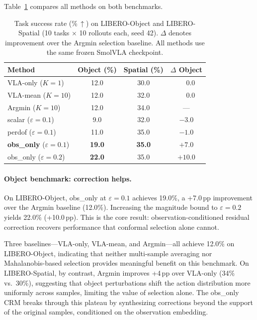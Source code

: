 Table~\ref{tab:main} compares all methods on both benchmarks.

\begin{table}[t]
\centering
\caption{Task success rate (\%\,$\uparrow$) on LIBERO-Object and LIBERO-Spatial (10 tasks $\times$ 10 rollouts each, seed 42). $\Delta$ denotes improvement over the Argmin selection baseline. All methods use the same frozen SmolVLA checkpoint.}
\label{tab:main}
\small
\begin{tabular}{lccc}
\toprule
Method & Object (\%) & Spatial (\%) & $\Delta$ Object \\
\midrule
VLA-only ($K{=}1$)    & 12.0 & 30.0 & $\phantom{+}0.0$ \\
VLA-mean ($K{=}10$)   & 12.0 & 32.0 & $\phantom{+}0.0$ \\
Argmin ($K{=}10$)      & 12.0 & 34.0 & --- \\
\midrule
scalar ($\varepsilon{=}0.1$)  & \phantom{0}9.0 & 32.0 & $-3.0$ \\
perdof ($\varepsilon{=}0.1$)  & 11.0 & 35.0 & $-1.0$ \\
\textbf{obs\_only} ($\varepsilon{=}0.1$) & \textbf{19.0} & \textbf{35.0} & $\mathbf{+7.0}$ \\
\midrule
obs\_only ($\varepsilon{=}0.2$) & \textbf{22.0} & 35.0 & $+10.0$ \\
\bottomrule
\end{tabular}
\end{table}

\paragraph{Object benchmark: correction helps.}
On LIBERO-Object, obs\_only at $\varepsilon{=}0.1$ achieves 19.0\%, a +7.0\,pp improvement over the Argmin baseline (12.0\%).
Increasing the magnitude bound to $\varepsilon{=}0.2$ yields 22.0\% (+10.0\,pp).
This is the core result: observation-conditioned residual correction recovers performance that conformal selection alone cannot.

Three baselines---VLA-only, VLA-mean, and Argmin---all achieve 12.0\% on LIBERO-Object, indicating that neither multi-sample averaging nor Mahalanobis-based selection provides meaningful benefit on this benchmark.
On LIBERO-Spatial, by contrast, Argmin improves +4\,pp over VLA-only (34\% vs.\ 30\%), suggesting that object perturbations shift the action distribution more uniformly across samples, limiting the value of selection alone.
The obs\_only CRM breaks through this plateau by synthesizing corrections beyond the support of the original samples, conditioned on the observation embedding.

